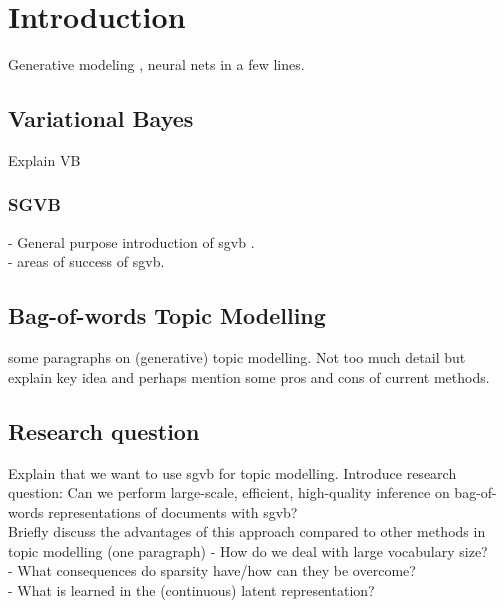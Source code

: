 \chapter{Introduction}

Generative modeling , neural nets in a few lines.


 

\section{Variational Bayes}

Explain VB

\subsection{SGVB}
 
- General purpose introduction of sgvb . \\

- areas of success of sgvb.

\section{Bag-of-words Topic Modelling}
some paragraphs on (generative) topic modelling. 
Not too much detail but explain key idea and perhaps mention some pros and cons of current methods. 
\section{Research question}
Explain that we want to use sgvb for topic modelling. Introduce research question:
Can we perform large-scale, efficient, high-quality inference on bag-of-words representations of documents with sgvb? \\
Briefly discuss the advantages of this approach compared to other methods in topic modelling (one paragraph)
-	How do we deal with large vocabulary size?\\
-	What consequences do sparsity have/how can they be overcome? \\
-	What is learned in the (continuous) latent representation?


